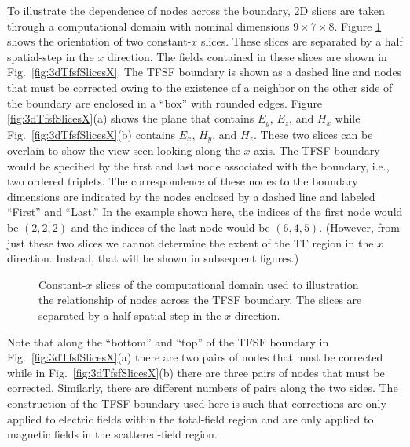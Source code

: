 To illustrate the dependence of nodes across the boundary, 2D slices
are taken through a computational domain with nominal dimensions
$9\times 7\times 8$.  Figure \ref{fig:3dTfsfConstantX} shows the
orientation of two constant-$x$ slices.  These slices are separated by
a half spatial-step in the $x$ direction.  The fields contained in
these slices are shown in Fig.\ \ref{fig:3dTfsfSlicesX}.  The TFSF
boundary is shown as a dashed line and nodes that must be corrected
owing to the existence of a neighbor on the other side of the boundary
are enclosed in a ``box'' with rounded edges.  Figure
\ref{fig:3dTfsfSlicesX}(a) shows the plane that contains $E_y$,
$E_z$, and $H_x$ while Fig.\
\ref{fig:3dTfsfSlicesX}(b) contains $E_x$, $H_y$, and $H_z$.
These two slices can be overlain to show the view seen looking along
the $x$ axis.  The TFSF boundary would be specified by the first and
last node associated with the boundary, i.e., two ordered triplets.
The correspondence of these nodes to the boundary dimensions are
indicated by the nodes enclosed by a dashed line and labeled ``First''
and ``Last.''  In the example shown here, the indices of the first
node would be $(2,2,2)$ and the indices of the last node would be
$(6,4,5)$.  (However, from just these two slices we cannot determine
the extent of the TF region in the $x$ direction.  Instead, that will
be shown in subsequent figures.)

\begin{figure}
  \begin{center}
  \end{center} 
  \caption{Constant-$x$ slices of the computational domain used to
  illustration the relationship of nodes across the TFSF boundary.
  The slices are separated by a half spatial-step in the $x$ direction.}
  \label{fig:3dTfsfConstantX} 
\end{figure}

Note that along the ``bottom'' and ``top'' of the TFSF boundary in
Fig.\ \ref{fig:3dTfsfSlicesX}(a) there are two pairs of nodes that
must be corrected while in Fig.\ \ref{fig:3dTfsfSlicesX}(b) there are
three pairs of nodes that must be corrected.  Similarly, there are
different numbers of pairs along the two sides.  The construction of
the TFSF boundary used here is such that corrections are only applied
to electric fields within the total-field region and are only applied
to magnetic fields in the scattered-field region.

